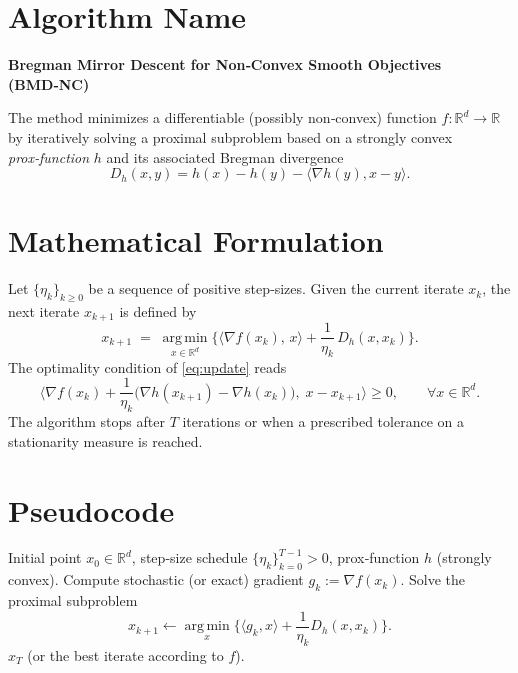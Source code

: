 \documentclass{article}
\newcommand{\argmin}{\operatorname*{arg\,min}}
\newcommand{\grad}{\nabla}
\newcommand{\D}[2]{D_h(#1,#2)}
\begin{document}
\section*{Algorithm Name}
\textbf{Bregman Mirror Descent for Non‑Convex Smooth Objectives (BMD‑NC)}  

The method minimizes a differentiable (possibly non‑convex) function $f:\mathbb{R}^d\to\mathbb{R}$ by iteratively solving a proximal subproblem based on a strongly convex \emph{prox‑function} $h$ and its associated Bregman divergence 
\[
\D{x}{y}=h(x)-h(y)-\langle \grad h(y),x-y\rangle .
\]

\section*{Mathematical Formulation}
Let $\{\eta_k\}_{k\ge 0}$ be a sequence of positive step‑sizes.  
Given the current iterate $x_k$, the next iterate $x_{k+1}$ is defined by
\begin{equation}
\label{eq:update}
x_{k+1}
\;=\;
\argmin_{x\in\mathbb{R}^d}
\Big\{
\langle \grad f(x_k),\,x\rangle
+\frac{1}{\eta_k}\,\D{x}{x_k}
\Big\}.
\end{equation}
The optimality condition of \eqref{eq:update} reads
\begin{equation}
\label{eq:optcond}
\Big\langle \grad f(x_k)+\frac{1}{\eta_k}\big(\grad h(x_{k+1})-\grad h(x_k)\big),\;x-x_{k+1}\Big\rangle\ge 0,
\qquad\forall x\in\mathbb{R}^d .
\end{equation}
The algorithm stops after $T$ iterations or when a prescribed tolerance on a stationarity measure is reached.

\section*{Pseudocode}
\begin{algorithm}[H]
\caption{BMD‑NC}
\begin{algorithmic}[1]
\Require Initial point $x_0\in\mathbb{R}^d$, step‑size schedule $\{\eta_k\}_{k=0}^{T-1}>0$, prox‑function $h$ (strongly convex).
    \State Compute stochastic (or exact) gradient $g_k:=\grad f(x_k)$.
    \State Solve the proximal subproblem
    \[
    x_{k+1}\gets\argmin_{x}\Big\{\langle g_k,x\rangle+\frac{1}{\eta_k}D_h(x,x_k)\Big\}.
    \]
\EndFor
\State \Return $x_T$ (or the best iterate according to $f$).
\end{algorithmic}
\end{algorithm}
\end{document}
